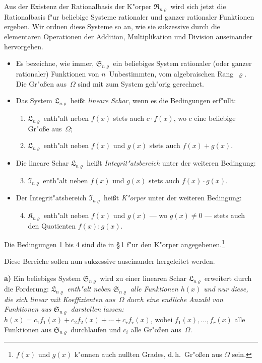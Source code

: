 \documentclass[11pt,a4paper]{article}
\begin{document}
Aus der Existenz der Rationalbasis der K"{o}rper $\mathfrak{R}_{n\varrho}$ wird sich jetzt
die Rationalbasis f"{u}r beliebige Systeme rationaler und ganzer rationaler
Funktionen ergeben. Wir ordnen diese Systeme so an, wie sie sukzessive
durch die elementaren Operationen der Addition, Multiplikation und
Division auseinander hervorgehen.
\begin{itemize}
\item[I.] Es bezeichne, wie immer, $\mathfrak{S}_{n\varrho}$ ein beliebiges System rationaler (oder
ganzer rationaler) Funktionen von $n$~Unbestimmten, vom algebraischen
Rang~$\varrho$. Die Gr"{o}\ss{}en aus~$\Omega$ sind mit zum System geh"{o}rig gerechnet.
\item[II.] Das System $\mathfrak{L}_{n\varrho}$ hei\ss{}t \emph{lineare Schar}, wenn es die Bedingungen erf"{u}llt:
\begin{enumerate}
\item $\mathfrak{L}_{n\varrho}$ enth"{a}lt neben $f(x)$ stets auch $c\cdot f(x)$, wo $c$ eine beliebige
Gr"{o}\ss{}e aus~$\Omega$;
\item $\mathfrak{L}_{n\varrho}$ enth"{a}lt neben $f(x)$ und $g(x)$ stets auch $f(x)+g(x)$.
\end{enumerate}
\item[III.] Die lineare Schar $\mathfrak{L}_{n\varrho}$ hei\ss{}t \emph{Integrit"{a}tsbereich} unter der weiteren
Bedingung:
\begin{enumerate}
\setcounter{enumi}{2}
\item $\mathfrak{I}_{n\varrho}$ enth"{a}lt neben $f(x)$ und $g(x)$ stets auch $f(x)\cdot g(x)$.
\end{enumerate}
\item[IV.] Der Integrit"{a}tsbereich $\mathfrak{I}_{n\varrho}$ hei\ss{}t \emph{K"{o}rper} unter der weiteren
Bedingung:
\begin{enumerate}
\setcounter{enumi}{3}
\item $\mathfrak{K}_{n\varrho}$ enth"{a}lt neben $f(x)$ und $g(x)$ --- wo $g(x)\neq 0$ --- stets auch
den Quotienten $f(x):g(x)$.
\end{enumerate}
\end{itemize}

Die Bedingungen 1 bis 4 sind die in \S\,1 f"{u}r den K"{o}rper angegebenen.\footnote{$f(x)$ und $g(x)$ k"{o}nnen auch nullten Grades, d.\,h.\ Gr"{o}\ss{}en aus $\Omega$ sein.}

Diese Bereiche sollen nun sukzessive auseinander hergeleitet werden.

\smallskip
\noindent\textbf{a)} Ein beliebiges System $\mathfrak{S}_{n\varrho}$ wird zu einer linearen Schar $\mathfrak{L}_{n\varrho}$ erweitert
durch die Forderung:
\emph{$\mathfrak{L}_{n\varrho}$ enth"{a}lt neben $\mathfrak{S}_{n\varrho}$ alle Funktionen $h(x)$ und nur diese, die sich linear
mit Koeffizienten aus~$\Omega$ durch eine endliche Anzahl von Funktionen
aus $\mathfrak{S}_{n\varrho}$ darstellen lassen:}
$h(x)=c_{1}f_{1}(x)+c_{2}f_{2}(x)+\cdots+c_{r}f_{r}(x)$,
wobei $f_{1}(x),\dots,f_{r}(x)$ alle Funktionen aus $\mathfrak{S}_{n\varrho}$ durchlaufen und $c_{i}$ alle
Gr"{o}\ss{}en aus~$\Omega$.
\end{document}
